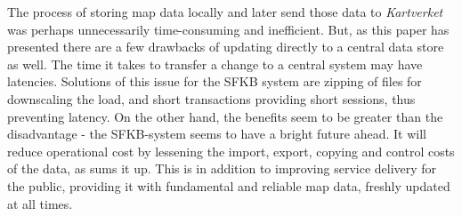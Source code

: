 The process of storing map data locally and later send those data to \textit{Kartverket} was perhaps unnecessarily time-consuming and inefficient. But, as this paper has presented there are a few drawbacks of updating directly to a central data store as well. The time it takes to transfer a change to a central system may have latencies. Solutions of this issue for the SFKB system are zipping of files for downscaling the load, and short transactions providing short sessions, thus preventing latency.
On the other hand, the benefits seem to be greater than the disadvantage - the SFKB-system seems to have a bright future ahead. It will reduce operational cost by lessening the import, export, copying and control costs of the data, as \cite{Kartverket2017e} sums it up.  This is in addition to improving service delivery for the public, providing it with fundamental and reliable map data, freshly updated at all times. 
